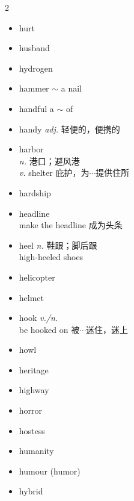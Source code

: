 \documentclass[../../book.tex]{subfiles}
\begin{document}
\begin{multicols}{2}
\begin{itemize}
\item[-] hurt
\item[-] husband
\item[-] hydrogen
\item[-] hammer \phantom{a} $\sim$ a nail
\item[-] handful \phantom{a} a $\sim$ of
\item[-] handy \emph{adj.} 轻便的，便携的
\item[-] harbor
\\\emph{n.} 港口；避风港
\\\emph{v.} shelter 庇护，为$\cdots$提供住所
\item[-] hardship
\item[-] headline
\\make the headline 成为头条
\item[-] heel \emph{n.} 鞋跟；脚后跟
\\high-heeled shoes
\item[-] helicopter
\item[-] helmet
\item[-] hook \emph{v./n.}
\\be hooked on 被$\cdots$迷住，迷上
\item[-] howl
\item[-] heritage
\item[-] highway
\item[-] horror
\item[-] hostess
\item[-] humanity
\item[-] humour (humor)
\item[-] hybrid
\end{itemize}
\end{multicols}
\end{document}
